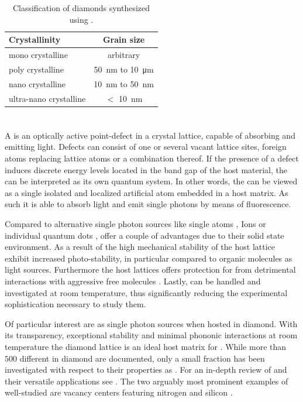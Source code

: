     \begin{table}[htbp]
  		\centering
  		\caption[Classification of diamond synthesized by \cvd]{Classification of diamonds synthesized using \CVD \cite{Steinmetz2011}.} \label{tab::diamond_grain_sizes}
  			\begin{tabular}{lc}
  			\toprule
  			Crystallinity & Grain size  \\
  			\midrule
  			mono crystalline & arbitrary \\
  			poly crystalline & \SI{50}{\nm} to \SI{10}{\micro\meter} \\
  			nano crystalline & \SI{10}{\nm} to \SI{50}{\nm} \\
  			ultra-nano crystalline & $<$ \SI{10}{\nm} \\
  			\bottomrule
  			\end{tabular}
  	\end{table}

\section{\Sivc} \label{sec::siv}

  A \cc is an optically active point-defect in a crystal lattice, capable of absorbing and emitting light. Defects can consist of one or several vacant lattice sites, foreign atoms replacing lattice atoms or a combination thereof. If the presence of a defect induces discrete energy levels located in the band gap of the host material, the \cc can be interpreted as its own quantum system. In other words, the \cc can be viewed as a single isolated and localized artificial atom embedded in a host matrix. As such it is able to absorb light and emit single photons by means of fluorescence.

  Compared to alternative single photon sources like single atoms \cite{Kuhn2002}, Ions \cite{Keller2004} or individual quantum dots \cite{Michler2000, Yuan2002}, \ccs offer a couple of advantages due to their solid state environment. As a result of the high mechanical stability of the host lattice \ccs exhibit increased photo-stability, in particular compared to organic molecules as light sources. Furthermore the host lattices offers protection for \ccs from detrimental interactions with aggressive free molecules \cite{Lounis2005}. Lastly, \ccs can be handled and investigated at room temperature, thus significantly reducing the experimental sophistication necessary to study them.

  Of particular interest are \ccs as single photon sources when hosted in diamond. With its transparency, exceptional stability and minimal phononic interactions at room temperature the diamond lattice is an ideal host matrix for \ccs \cite{Kennedy2003,Greentree2008}. While more than $500$ different \ccs in diamond are documented, only a small fraction has been investigated with respect to their properties as \spss \cite{Zaitsev2001}. For an in-depth review of \ccs and their versatile applications see \cite{Aharonovich2014, Prawer2014}. The two arguably most prominent examples of well-studied \ccs are vacancy centers featuring nitrogen and silicon \cite{Manson2006, Jelezko2002, Santori2006}.

